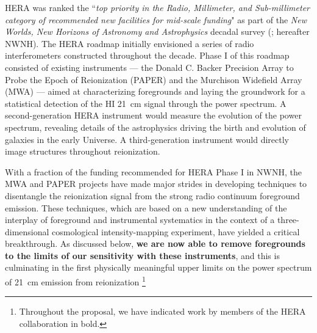 \documentclass[preprint]{aastex}
\newcommand{\Mycitep}[1]{{\bf \citep{#1}}}
\begin{document}
HERA was ranked the ``{\it top priority in the Radio, Millimeter, and
Sub-millimeter category of recommended new facilities for mid-scale
funding}" as part of the {\it New Worlds, New Horizons of Astronomy
and Astrophysics} decadal survey (\citealt{astro2010}; hereafter
NWNH).  The HERA roadmap initially envisioned a series of radio
interferometers constructed throughout the decade. Phase I of this roadmap
consisted of existing instruments --- the Donald C. Backer Precision Array to Probe the Epoch of
Reionization (PAPER) and the Murchison Widefield Array (MWA) ---
aimed at characterizing foregrounds and laying the
groundwork for a statistical detection of the HI 21~cm signal through
the power spectrum.  A second-generation HERA instrument would measure
the evolution of the power spectrum, revealing details of the astrophysics driving
the birth and evolution of galaxies 
in the early Universe. A third-generation instrument would
directly image structures throughout reionization.

With a fraction of the funding recommended for HERA Phase I
in NWNH, the MWA and PAPER projects have made
major strides in developing techniques to disentangle
the reionization signal from the strong radio continuum foreground
emission.  These techniques, which are based on a new
understanding of the interplay of foreground and instrumental systematics
in the context of a three-dimensional cosmological intensity-mapping experiment,
have yielded a critical breakthrough.  As discussed below, {\bf we are now able to remove 
foregrounds to the limits of our sensitivity with these instruments},
and this is culminating in the first physically meaningful upper limits
on the power spectrum of 21~cm emission from reionization \Mycitep{parsons_et_al2013}\footnote{Throughout the proposal, we have indicated work by members of the HERA collaboration in bold.}


\end{document}
